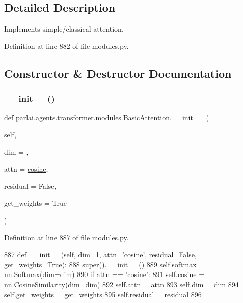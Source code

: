 \subsection{Detailed Description}
\begin{DoxyVerb}Implements simple/classical attention.
\end{DoxyVerb}
 

Definition at line 882 of file modules.\+py.



\subsection{Constructor \& Destructor Documentation}
\mbox{\label{classparlai_1_1agents_1_1transformer_1_1modules_1_1BasicAttention_afa25129ca6ce9851053205f44f090fd6}} 
\subsubsection{\texorpdfstring{\+\_\+\+\_\+init\+\_\+\+\_\+()}{\_\_init\_\_()}}
{\footnotesize\ttfamily def parlai.\+agents.\+transformer.\+modules.\+Basic\+Attention.\+\_\+\+\_\+init\+\_\+\+\_\+ (\begin{DoxyParamCaption}\item[{}]{self,  }\item[{}]{dim = {},  }\item[{}]{attn = {\ttfamily \textquotesingle{}\hyperlink{classparlai_1_1agents_1_1transformer_1_1modules_1_1BasicAttention_abed26e42fa2293f14cbbcf51c090794c}{cosine}\textquotesingle{}},  }\item[{}]{residual = {\ttfamily False},  }\item[{}]{get\+\_\+weights = {\ttfamily True} }\end{DoxyParamCaption})}



Definition at line 887 of file modules.\+py.


\begin{DoxyCode}
887     \textcolor{keyword}{def }\_\_init\_\_(self, dim=1, attn='cosine', residual=False, get\_weights=True):
888         super().\_\_init\_\_()
889         self.softmax = nn.Softmax(dim=dim)
890         \textcolor{keywordflow}{if} attn == \textcolor{stringliteral}{'cosine'}:
891             self.cosine = nn.CosineSimilarity(dim=dim)
892         self.attn = attn
893         self.dim = dim
894         self.get\_weights = get\_weights
895         self.residual = residual
896 
\end{DoxyCode}


